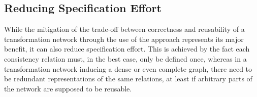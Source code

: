 


\subsection{Reducing Specification Effort}

While the mitigation of the trade-off between correctness and reusability of a transformation network through the use of the \commonalities approach represents its major benefit, it can also reduce specification effort.
This is achieved by the fact each consistency relation must, in the best case, only be defined once, whereas in a transformation network inducing a dense or even complete graph, there need to be redundant representations of the same relations, at least if arbitrary parts of the network are supposed to be reusable.


